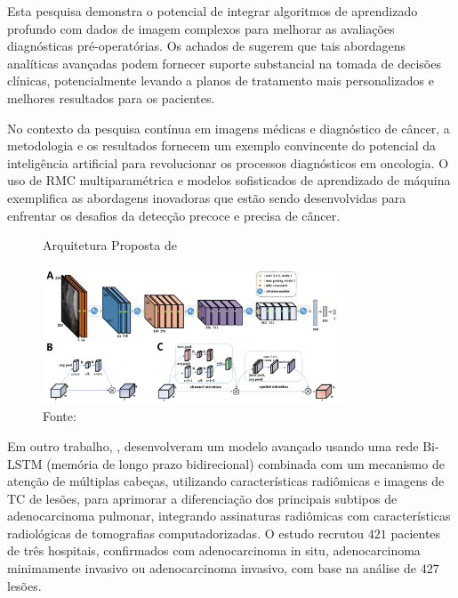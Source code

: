 Esta pesquisa demonstra o potencial de integrar algoritmos de aprendizado profundo com dados de imagem complexos para melhorar as avaliações diagnósticas pré-operatórias. Os achados de  sugerem que tais abordagens analíticas avançadas podem fornecer suporte substancial na tomada de decisões clínicas, potencialmente levando a planos de tratamento mais personalizados e melhores resultados para os pacientes.

No contexto da pesquisa contínua em imagens médicas e diagnóstico de câncer, a metodologia e os resultados fornecem um exemplo convincente do potencial da inteligência artificial para revolucionar os processos diagnósticos em oncologia. O uso de \gls{RMC} multiparamétrica e modelos sofisticados de aprendizado de máquina exemplifica as abordagens inovadoras que estão sendo desenvolvidas para enfrentar os desafios da detecção precoce e precisa de câncer.

\begin{figure}[htbp]
    \centering
    \caption{Arquitetura Proposta de }
    \includegraphics[width=0.8\textwidth]{figures/fig007.png}
    \caption*{Fonte: \cite{jiangMRIBasedRadiomics2021}}
    \label{fig:fig007}
\end{figure}

Em outro trabalho, , desenvolveram um modelo avançado usando uma rede Bi-LSTM (memória de longo prazo bidirecional) combinada com um mecanismo de atenção de múltiplas cabeças, utilizando características radiômicas e imagens de \gls{TC} de lesões, para aprimorar a diferenciação dos principais subtipos de adenocarcinoma pulmonar, integrando assinaturas radiômicas com características radiológicas de tomografias computadorizadas. O estudo recrutou $421$ pacientes de três hospitais, confirmados com adenocarcinoma in situ, adenocarcinoma minimamente invasivo ou adenocarcinoma invasivo, com base na análise de $427$ lesões.

